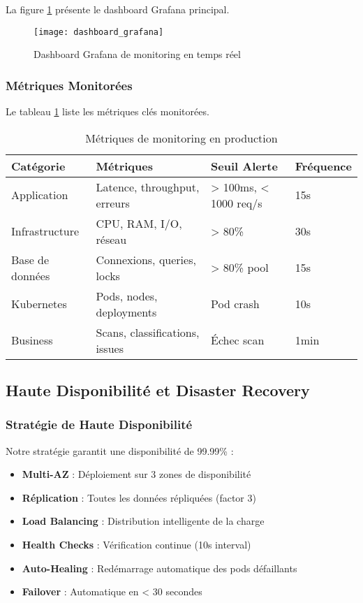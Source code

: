 La figure \ref{fig:dashboard_grafana} présente le dashboard Grafana principal.

\begin{figure}[htpb]
\centering
\texttt{[image: dashboard\_grafana]}
\caption{Dashboard Grafana de monitoring en temps réel}
\label{fig:dashboard_grafana}
\end{figure}

\subsubsection{Métriques Monitorées}

Le tableau \ref{tab:metriques_monitoring} liste les métriques clés monitorées.

\begin{table}[htpb]
\centering
\caption{Métriques de monitoring en production}
\label{tab:metriques_monitoring}
\begin{tabular}{|p{}|p{}|p{}|p{}|}
\hline
\textbf{Catégorie} & \textbf{Métriques} & \textbf{Seuil Alerte} & \textbf{Fréquence} \\
\hline
Application & Latence, throughput, erreurs & > 100ms, < 1000 req/s & 15s \\
\hline
Infrastructure & CPU, RAM, I/O, réseau & > 80\% & 30s \\
\hline
Base de données & Connexions, queries, locks & > 80\% pool & 15s \\
\hline
Kubernetes & Pods, nodes, deployments & Pod crash & 10s \\
\hline
Business & Scans, classifications, issues & Échec scan & 1min \\
\hline
\end{tabular}
\end{table}

\subsection{Haute Disponibilité et Disaster Recovery}

\subsubsection{Stratégie de Haute Disponibilité}

Notre stratégie garantit une disponibilité de 99.99\% :
\begin{itemize}
    \item \textbf{Multi-AZ} : Déploiement sur 3 zones de disponibilité
    \item \textbf{Réplication} : Toutes les données répliquées (factor 3)
    \item \textbf{Load Balancing} : Distribution intelligente de la charge
    \item \textbf{Health Checks} : Vérification continue (10s interval)
    \item \textbf{Auto-Healing} : Redémarrage automatique des pods défaillants
    \item \textbf{Failover} : Automatique en < 30 secondes
\end{itemize}


